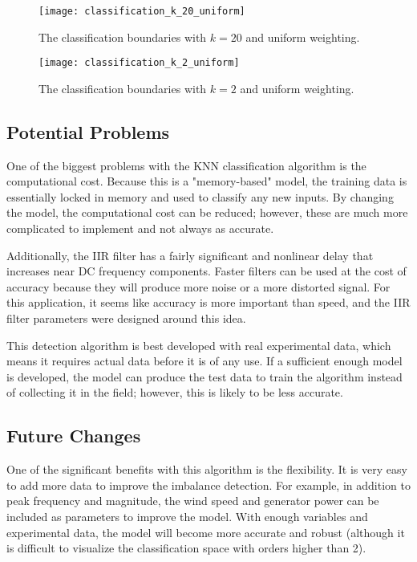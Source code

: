\begin{figure}
	\centering
	\texttt{[image: classification\_k\_20\_uniform]}
	\decoRule
	\caption{The classification boundaries with $k=20$ and uniform weighting.}
	\label{fig:classification_k_20_uniform}
\end{figure}

\begin{figure}
	\centering
	\texttt{[image: classification\_k\_2\_uniform]}
	\decoRule
	\caption{The classification boundaries with $k=2$ and uniform weighting.}
	\label{fig:classification_k_2_uniform}
\end{figure}

\subsection{Potential Problems}
One of the biggest problems with the KNN classification algorithm is the computational cost.  Because this is a "memory-based" model, the training data is essentially locked in memory and used to classify any new inputs.  By changing the model, the computational cost can be reduced; however, these are much more complicated to implement and not always as accurate.

Additionally, the IIR filter has a fairly significant and nonlinear delay that increases near DC frequency components.  Faster filters can be used at the cost of accuracy because they will produce more noise or a more distorted signal.  For this application, it seems like accuracy is more important than speed, and the IIR filter parameters were designed around this idea.

This detection algorithm is best developed with real experimental data, which means it requires actual data before it is of any use.  If a sufficient enough model is developed, the model can produce the test data to train the algorithm instead of collecting it in the field; however, this is likely to be less accurate.

\subsection{Future Changes}


One of the significant benefits with this algorithm is the flexibility.  It is very easy to add more data to improve the imbalance detection.  For example, in addition to peak frequency and magnitude, the wind speed and generator power can be included as parameters to improve the model.  With enough variables and experimental data, the model will become more accurate and robust (although it is difficult to visualize the classification space with orders higher than 2).

